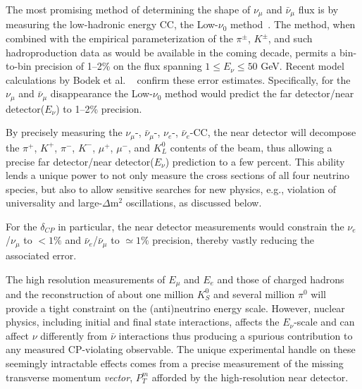The most promising method of determining the shape of $\nu_\mu$ and
$\bar \nu_\mu$ flux is by measuring the low-hadronic energy CC, the
Low-$\nu_0$ method~\cite{MISHRA-Nu0}. The method, when combined with
the empirical parameterization of the $\pi^{\pm}$, $K^{\pm}$, and such
hadroproduction data as would be available in the coming decade,
permits a bin-to-bin precision of 1--2\% on the flux spanning $1 \leq
E_\nu \leq 50$ GeV.  Recent model
calculations by Bodek et al. ~\cite{Bodek:2012uu} confirm these error
estimates.  Specifically, for the $\nu_\mu$ and $\bar \nu_\mu$
disappearance the Low-$\nu_0$ method would predict the far
detector/near detector($E_\nu$) to 1--2\% precision.

By precisely measuring the $\nu_\mu$-, $\bar \nu_\mu$-, $\nu_e$-,
$\bar \nu_e$-CC, the near detector will decompose the $\pi^+$, $K^+$,
$\pi^-$, $K^-$, $\mu^+$, $\mu^-$, and $K^0_L$ contents of the beam,
thus allowing a precise far detector/near detector($E_\nu$) prediction
to a few percent.  This ability lends a unique power to not only
measure the cross sections of all four neutrino species, but also to
allow sensitive searches for new physics, e.g., violation of
universality and large-$\Delta$m$^2$ oscillations, as
discussed %
below.

\noindent
For the $\delta_{CP}$ in particular, the near detector measurements
would constrain the $\nu_e$/$\nu_\mu$ to $<1\%$ and $\bar \nu_e$/$\bar
\nu_\mu$ to $\simeq 1\%$ precision, thereby vastly reducing the
associated error.



The high resolution measurements of $E_\mu$ and $E_e$ and those of
charged hadrons and the reconstruction of about one million $K^0_S$
and several million $\pi^0$ will provide a tight constraint on the
(anti)neutrino energy scale.  However, nuclear physics, including
initial and final state interactions, affects the $E_\nu$-scale and
can affect $\nu$ differently from $\bar\nu$ interactions thus
producing a spurious contribution to any measured CP-violating
observable.  The unique experimental handle on these seemingly
intractable effects comes from a precise measurement of the missing
transverse momentum {\it vector},{ \bf{ $P^m_T$}} afforded by the
high-resolution near detector.


